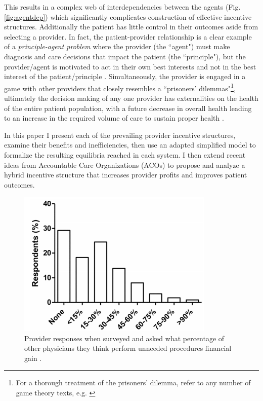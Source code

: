 \documentclass{article}
\begin{document}
This results in a complex web of interdependencies between the agents (Fig. \ref{fig:agentdep}) which significantly complicates construction of effective incentive structures. Additionally the patient has little control in their outcomes aside from selecting a provider. In fact, the patient-provider relationship is a clear example of a \emph{principle-agent problem} \cite{principle} where the provider (the ``agent") must make diagnosis and care decisions that impact the patient (the ``principle"), but the provider/agent is motivated to act in their own best interests and not in the best interest of the patient/principle \cite{msdt}. Simultaneously, the provider is engaged in a game with other providers that closely resembles a ``prisoners' dilemmas"\footnote{For a thorough treatment of the prisoners' dilemma, refer to any number of game theory texts, e.g. \cite{networks}}, ultimately the decision making of any one provider has externalities on the health of the entire patient population, with a future decrease in overall health leading to an increase in the required volume of care to sustain proper health \cite{blended}.

In this paper I present each of the prevailing provider incentive structures, examine their benefits and inefficiencies, then use an adapted simplified model to formalize the resulting equilibria reached in each system. I then extend recent ideas from Accountable Care Organizations (ACOs) to propose and analyze a hybrid incentive structure that increases provider profits and improves patient outcomes.

\begin{figure}[H]
\includegraphics[height=7cm]{overtreat}
\centering
\caption{Provider responses when surveyed and asked what percentage of other physicians they think perform unneeded procedures financial gain \cite{overtreat}.}
\label{fig:overtreat}
\end{figure}
\end{document}
